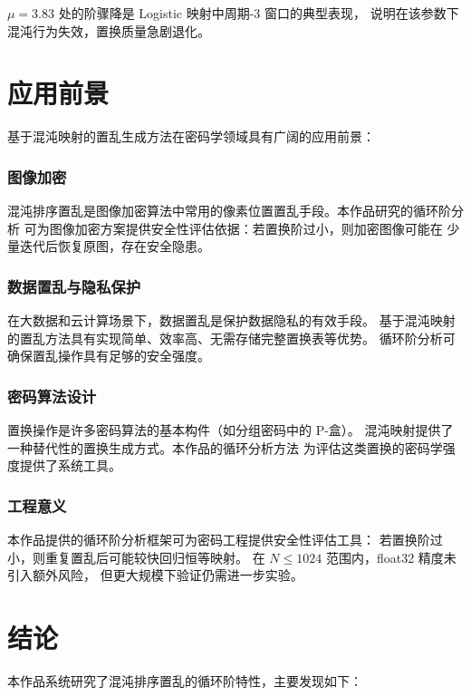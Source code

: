 \documentclass[12pt,a4paper]{ctexrep}
\begin{document}
$\mu=3.83$ 处的阶骤降是 Logistic 映射中周期-3 窗口的典型表现，
说明在该参数下混沌行为失效，置换质量急剧退化。

\chapter{应用前景}

基于混沌映射的置乱生成方法在密码学领域具有广阔的应用前景：

\subsection*{图像加密}

混沌排序置乱是图像加密算法中常用的像素位置置乱手段。本作品研究的循环阶分析
可为图像加密方案提供安全性评估依据：若置换阶过小，则加密图像可能在
少量迭代后恢复原图，存在安全隐患。

\subsection*{数据置乱与隐私保护}

在大数据和云计算场景下，数据置乱是保护数据隐私的有效手段。
基于混沌映射的置乱方法具有实现简单、效率高、无需存储完整置换表等优势。
循环阶分析可确保置乱操作具有足够的安全强度。

\subsection*{密码算法设计}

置换操作是许多密码算法的基本构件（如分组密码中的 P-盒）。
混沌映射提供了一种替代性的置换生成方式。本作品的循环分析方法
为评估这类置换的密码学强度提供了系统工具。

\subsection*{工程意义}

本作品提供的循环阶分析框架可为密码工程提供安全性评估工具：
若置换阶过小，则重复置乱后可能较快回归恒等映射。
在 $N\leq 1024$ 范围内，float32 精度未引入额外风险，
但更大规模下验证仍需进一步实验。

\chapter{结论}

本作品系统研究了混沌排序置乱的循环阶特性，主要发现如下：
\end{document}
